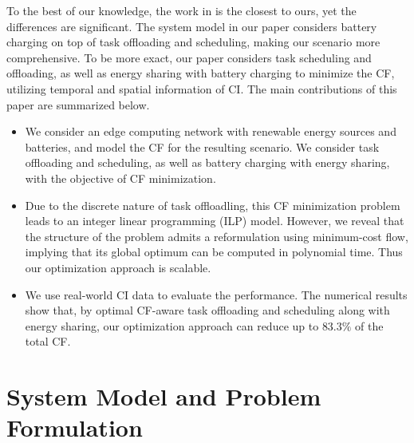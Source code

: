 \documentclass[conference, 10pt, ﬁnal, letterpaper, twocolumn]{IEEEtran}
\begin{document}
To the best of our knowledge, the work in \cite{yang2022carbon} is the closest to ours, yet the differences are significant. The system model in our paper considers battery charging on top of task offloading and scheduling, making our scenario more comprehensive. To be more exact, our paper considers task scheduling and offloading, as well as energy sharing with battery charging to minimize the CF, utilizing temporal and spatial information of CI. The main contributions of this paper are summarized below.
\begin{itemize}
    \item We consider an edge computing network with renewable energy sources and batteries, and model the CF for the resulting scenario. We consider task offloading and scheduling, as well as battery charging with energy sharing, with the objective of CF minimization. 
    \item Due to the discrete nature of task offloadling, this CF minimization problem leads to an integer linear programming (ILP) model. However, we reveal that the structure of the problem admits a reformulation using minimum-cost flow, implying that its global optimum can be computed in polynomial time. Thus our optimization approach is scalable. 
    \item We use real-world CI data to evaluate the performance. The numerical results show that, by optimal CF-aware task offloading and scheduling along with energy sharing, our optimization approach can reduce up to $83.3\%$ of the total CF.
\end{itemize}


\section{System Model and Problem Formulation}


\end{document}
